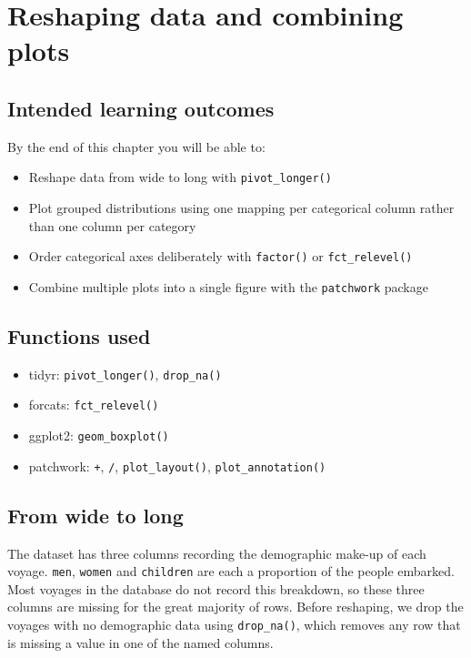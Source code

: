 \documentclass[
  english,
  letterpaper,
]{book}
\providecommand{\tightlist}{%
  \setlength{\itemsep}{0pt}\setlength{\parskip}{0pt}}
\begin{document}

\chapter{Reshaping data and combining plots}\label{sec-reshaping}

\section{Intended learning outcomes}\label{intended-learning-outcomes-5}

By the end of this chapter you will be able to:

\begin{itemize}
\tightlist
\item
  Reshape data from wide to long with \texttt{pivot\_longer()}
\item
  Plot grouped distributions using one mapping per categorical column
  rather than one column per category
\item
  Order categorical axes deliberately with \texttt{factor()} or
  \texttt{fct\_relevel()}
\item
  Combine multiple plots into a single figure with the
  \texttt{patchwork} package
\end{itemize}

\section{Functions used}\label{functions-used-4}

\begin{itemize}
\tightlist
\item
  tidyr: \texttt{pivot\_longer()}, \texttt{drop\_na()}
\item
  forcats: \texttt{fct\_relevel()}
\item
  ggplot2: \texttt{geom\_boxplot()}
\item
  patchwork: \texttt{+}, \texttt{/}, \texttt{plot\_layout()},
  \texttt{plot\_annotation()}
\end{itemize}

\section{From wide to long}\label{sec-wide-to-long}

The dataset has three columns recording the demographic make-up of each
voyage. \texttt{men}, \texttt{women} and \texttt{children} are each a
proportion of the people embarked. Most voyages in the database do not
record this breakdown, so these three columns are missing for the great
majority of rows. Before reshaping, we drop the voyages with no
demographic data using \texttt{drop\_na()}, which removes any row that
is missing a value in one of the named columns.
\end{document}
